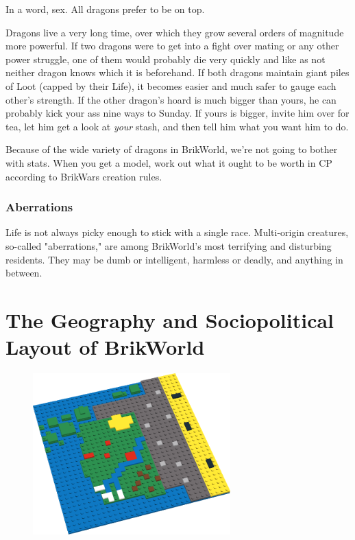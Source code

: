 \documentclass[12pt,a4paper,twocolumn]{article}
\begin{document}
In a word, sex.  All dragons prefer to be on top.

Dragons live a very long time, over which they grow several orders of magnitude more powerful.  If two dragons were to get into a fight over mating or any other power struggle, one of them would probably die very quickly and like as not neither dragon knows which it is beforehand.  If both dragons maintain giant piles of Loot (capped by their Life), it becomes easier and much safer to gauge each other's strength.  If the other dragon's hoard is much bigger than yours, he can probably kick your ass nine ways to Sunday.  If yours is bigger, invite him over for tea, let him get a look at {\it your} stash, and then tell him what you want him to do.

Because of the wide variety of dragons in BrikWorld, we're not going to bother with stats.  When you get a model, work out what it ought to be worth in CP according to BrikWars creation rules.

\subsubsection{Aberrations}

Life is not always picky enough to stick with a single race.  Multi-origin creatures, so-called "aberrations," are among BrikWorld's most terrifying and disturbing residents.  They may be dumb or intelligent, harmless or deadly, and anything in between.

\section{The Geography and Sociopolitical Layout of BrikWorld}

\begin{figure}[h]
\includegraphics[width=3in]{WildNations.png}
\end{figure}
\end{document}
